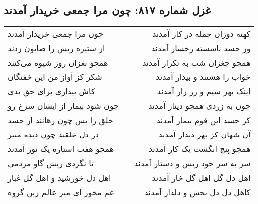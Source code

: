 \begin{center}
\section*{غزل شماره ۸۱۷: چون مرا جمعی خریدار آمدند}
\label{sec:0817}
\begin{longtable}{l p{0.5cm} r}
چون مرا جمعی خریدار آمدند
&&
کهنه دوزان جمله در کار آمدند
\\
از ستیزه ریش را صابون زدند
&&
وز حسد ناشسته رخسار آمدند
\\
همچو نغزان روز شیوه می‌کنند
&&
همچو چغزان شب به تکرار آمدند
\\
شکر کز آواز من این خفتگان
&&
خواب را هشتند و بیدار آمدند
\\
کاش بیداری برای حق بدی
&&
اینک بهر سیم و زر زار آمدند
\\
چون شود بیمار از ایشان سرخ رو
&&
چون به زردی همچو دینار آمدند
\\
خلق را پس چون رهانند از حسد
&&
کز حسد این قوم بیمار آمدند
\\
در دل خلقند چون دیده منیر
&&
آن شهان کز بهر دیدار آمدند
\\
همچو هفت استاره یک نور آمدند
&&
همچو پنج انگشت یک کار آمدند
\\
تا نگردی ریش گاو مردمی
&&
سر به سر خود ریش و دستار آمدند
\\
اهل دل خورشید و اهل گل غبار
&&
اهل دل گل اهل گل خار آمدند
\\
غم مخور ای میر عالم زین گروه
&&
کاهل دل دل بخش و دلدار آمدند
\\
\end{longtable}
\end{center}
